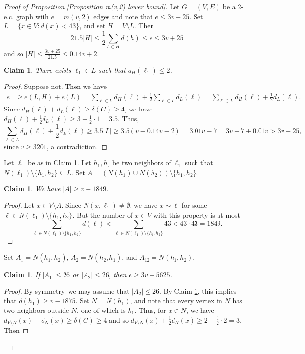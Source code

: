 \documentclass{article}
\newcommand\sm{\setminus}
\newtheorem{claim}[thm]{Claim}
\theoremstyle{definition}
\begin{document}
\begin{proof}[Proof of Proposition \ref{Proposition m(v,2) lower bound}]
    Let $G=(V,E)$ be a 2-e.c. graph with $e=m(v,2)$ edges and note that $e\le 3v+25$. Set $L=\{x\in V:d(x)< 43\}$, and set $H=V\sm L$. Then
    $$21.5|H|\le\frac{1}{2}\sum_{h\in H}d(h)\le e\le 3v+25$$
    and so $|H|\le\frac{3v+25}{21.5}\le 0.14v+2.$
    \begin{claim} \label{Claim 2 H neighbors}
    There exists $\ell_1\in L$ such that $d_H(\ell_1)\le 2$.
    \end{claim}
    \begin{proof}
        Suppose not. Then we have
        $$\begin{aligned}
            e&\ge e(L,H)+e(L)=\sum_{\ell\in L}d_H(\ell)+\frac{1}{2}\sum_{\ell\in L}d_L(\ell)
            =\sum_{\ell\in L}d_H(\ell)+\frac{1}{2}d_L(\ell).
        \end{aligned}$$
        Since $d_H(\ell)+d_L(\ell)\ge \delta(G)\ge 4$, we have $d_H(\ell)+\frac{1}{2}d_L(\ell)\ge 3+\frac{1}{2}\cdot 1=3.5.$ Thus,
        $$\sum_{\ell\in L}d_H(\ell)+\frac{1}{2}d_L(\ell)\ge 3.5|L|\ge 3.5(v-0.14v-2)=3.01v-7=3v-7+0.01v>3v+25,$$
        since $v\ge 3201$, a contradiction. 
    \end{proof}
    Let $\ell_1$ be as in Claim \ref{Claim 2 H neighbors}. Let $h_1,h_2$ be two  neighbors of $\ell_1$ such that $N(\ell_1)\sm\{h_1,h_2\}\subseteq L$. Set $A=(N(h_1)\cup N(h_2))\sm\{h_1,h_2\}.$
    \begin{claim} \label{Claim h1 h2 dominating}
        We have $|A|\ge v-1849.$
    \end{claim}
    \begin{proof}
    Let $x\in V\sm A$. Since $N(x,\ell_1)\ne\emptyset$, we have $x\sim \ell$ for some $\ell\in N(\ell_1)\sm\{h_1,h_2\}$. But the number of $x\in V$ with this property is at most
    $$\sum_{\ell\in N(\ell_1)\sm\{h_1,h_2\}}d(\ell)<\sum_{\ell\in N(\ell_1)\sm\{h_1,h_2\}}43<43\cdot 43=1849.$$
    \end{proof}
    Set $A_1=N(h_1,\overline{h_2})$, $A_2=N(h_2,\overline{h_1})$, and $A_{12}=N(h_1,h_2)$.
    \begin{claim} \label{Claim A1 A2 size}
        If $|A_1|\le 26$ or $|A_2|\le 26$, then $e\ge 3v-5625$.
    \end{claim}
    \begin{proof}
        By symmetry, we may assume that $|A_2|\le 26$. By Claim \ref{Claim h1 h2 dominating}, this implies that $d(h_1)\ge v-1875$. Set $N=N(h_1)$, and note that every vertex in $N$ has two neighbors outside $N$, one of which is $h_1$. Thus, for $x\in N$, we have $d_{V\sm N}(x)+d_N(x)\ge \delta(G)\ge 4$ and so $d_{V\sm N}(x)+\frac{1}{2}d_N(x)\ge 2+\frac{1}{2}\cdot 2=3$. Then

\end{proof}
\end{proof}
\end{document}
